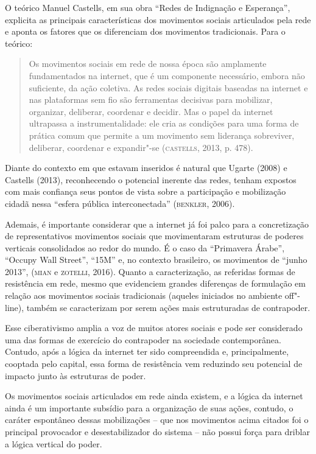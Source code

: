 O teórico Manuel Castells, em sua obra ``Redes de Indignação e
Esperança'', explicita as principais características dos movimentos
sociais articulados pela rede e aponta os fatores que os diferenciam dos
movimentos tradicionais. Para o teórico:

\begin{quote}
Os movimentos sociais em rede de nossa época são amplamente
fundamentados na internet, que é um componente necessário, embora não
suficiente, da ação coletiva. As redes sociais digitais baseadas na
internet e nas plataformas sem fio são ferramentas decisivas para
mobilizar, organizar, deliberar, coordenar e decidir. Mas o papel da
internet ultrapassa a instrumentalidade: ele cria as condições para uma
forma de prática comum que permite a um movimento sem liderança
sobreviver, deliberar, coordenar e expandir"-se (\textsc{castells}, 2013, p. 478).
\end{quote}

Diante do contexto em que estavam inseridos é natural que Ugarte (2008)
e Castells (2013), reconhecendo o potencial inerente das redes, tenham
expostos com mais confiança seus pontos de vista sobre a participação e
mobilização cidadã nessa ``esfera pública interconectada'' (\textsc{benkler},
2006).

Ademais, é importante considerar que a internet já foi palco para a
concretização de representativos movimentos sociais que movimentaram
estruturas de poderes verticais consolidados ao redor do mundo. É o caso
da ``Primavera Árabe'', ``Occupy Wall Street'', ``15M'' e, no contexto
brasileiro, os movimentos de ``junho 2013'', (\textsc{mian} e \textsc{zotelli}, 2016).
Quanto a caracterização, as referidas formas de resistência em rede,
mesmo que evidenciem grandes diferenças de formulação em relação aos
movimentos sociais tradicionais (aqueles iniciados no ambiente
off"-line), também se caracterizam por serem ações mais estruturadas de
contrapoder.

Esse ciberativismo amplia a voz de muitos atores sociais e pode ser
considerado uma das formas de exercício do contrapoder na sociedade
contemporânea. Contudo, após a lógica da internet ter sido compreendida
e, principalmente, cooptada pelo capital, essa forma de resistência vem
reduzindo seu potencial de impacto junto às estruturas de poder.

Os movimentos sociais articulados em rede ainda existem, e a lógica da
internet ainda é um importante subsídio para a organização de suas
ações, contudo, o caráter espontâneo dessas mobilizações -- que nos
movimentos acima citados foi o principal provocador e desestabilizador
do sistema -- não possui força para driblar a lógica vertical do poder.

